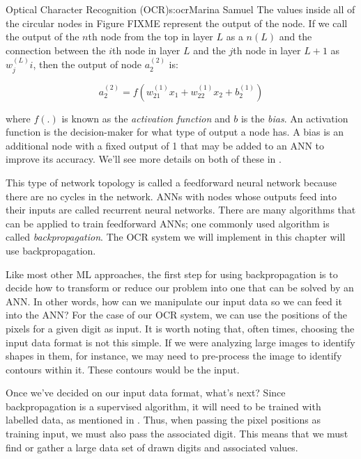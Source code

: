 \begin{aosachapter}{Optical Character Recognition (OCR)}{s:ocr}{Marina Samuel}
The values inside all of the circular nodes in Figure FIXME represent
the output of the node. If we call the output of the $n$th node from the
top in layer $L$ as a $n(L)$ and the connection between the $i$th node
in layer $L$ and the $j$th node in layer $L+1$ as $w^{(L)}_ji$, then the
output of node $a^{(2)}_2$ is:

\[
a^{(2)}_2 = f(w^{(1)}_{21}x_1 + w^{(1)}_{22}x_2 + b^{(1)}_{2})
\]

where $f(.)$ is known as the \emph{activation function} and $b$ is the
\emph{bias}. An activation function is the decision-maker for what type
of output a node has. A bias is an additional node with a fixed output
of 1 that may be added to an ANN to improve its accuracy. We'll see more
details on both of these in .

This type of network topology is called a feedforward neural network
because there are no cycles in the network. ANNs with nodes whose
outputs feed into their inputs are called recurrent neural networks.
There are many algorithms that can be applied to train feedforward ANNs;
one commonly used algorithm is called \emph{backpropagation}. The OCR
system we will implement in this chapter will use backpropagation.

\label{how-do-we-use-anns}

Like most other ML approaches, the first step for using backpropagation
is to decide how to transform or reduce our problem into one that can be
solved by an ANN. In other words, how can we manipulate our input data
so we can feed it into the ANN? For the case of our OCR system, we can
use the positions of the pixels for a given digit as input. It is worth
noting that, often times, choosing the input data format is not this
simple. If we were analyzing large images to identify shapes in them,
for instance, we may need to pre-process the image to identify contours
within it. These contours would be the input.

Once we've decided on our input data format, what's next? Since
backpropagation is a supervised algorithm, it will need to be trained
with labelled data, as mentioned in . Thus, when
passing the pixel positions as training input, we must also pass the
associated digit. This means that we must find or gather a large data
set of drawn digits and associated values.


\end{aosachapter}
